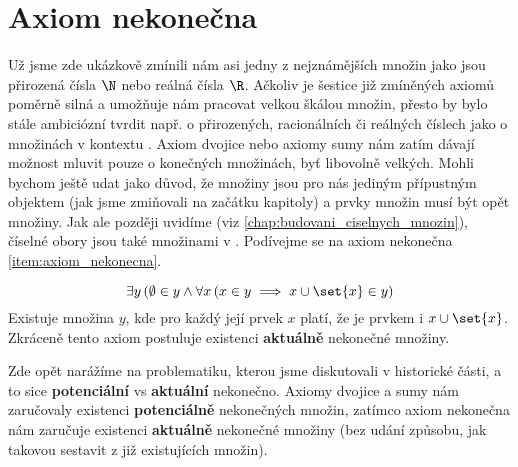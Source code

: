 \section{Axiom nekonečna}\label{sec:axiom_nekonecna}
Už jsme zde ukázkově zmínili nám asi jedny z nejznámějších množin jako jsou přirozená čísla $\N$ nebo reálná čísla $\R$. Ačkoliv je šestice již zmíněných axiomů poměrně silná a umožňuje nám pracovat velkou škálou množin, přesto by bylo stále ambiciózní tvrdit např. o přirozených, racionálních či reálných číslech jako o množinách v kontextu \ZF. Axiom dvojice nebo axiomy sumy nám zatím dávají možnost mluvit pouze o konečných množinách, byť libovolně velkých. Mohli bychom ještě udat jako důvod, že množiny jsou pro nás jediným přípustným objektem (jak jsme zmiňovali na začátku kapitoly) a prvky množin musí být opět množiny. Jak ale později uvidíme (viz \ref{chap:budovani_ciselnych_mnozin}), číselné obory jsou také množinami v \ZF. Podívejme se na axiom nekonečna \ref{item:axiom_nekonecna}.
\medskip

\begin{equation*}
    \exists y\, (\emptyset\in y \land \forall x\,(x\in y\implies x\cup\set{x}\in y)
\end{equation*}
Existuje množina $y$, kde pro každý její prvek $x$ platí, že je prvkem i $x\cup\set{x}$. Zkráceně tento axiom postuluje existenci \textbf{aktuálně} nekonečné množiny.\par
Zde opět narážíme na problematiku, kterou jsme diskutovali v historické části, a to sice \textbf{potenciální} vs \textbf{aktuální} nekonečno. Axiomy dvojice a sumy nám zaručovaly existenci \textbf{potenciálně} nekonečných množin, zatímco axiom nekonečna nám zaručuje existenci \textbf{aktuálně} nekonečné množiny (bez udání způsobu, jak takovou sestavit z již existujících množin).\par